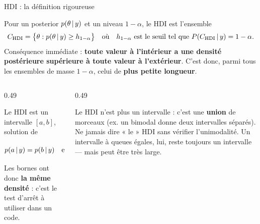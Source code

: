 
\begin{frame}{HDI : la définition rigoureuse}
\small
\vspace{-1mm}
\begin{kbox}
Pour un posterior $p(\theta \,\vert\, y)$ et un niveau $1-\alpha$, le HDI est
l'ensemble
\[
C_{\text{HDI}} = \big\{\theta : p(\theta \,\vert\, y) \geq h_{1-\alpha}\big\}
\quad\text{où}\quad h_{1-\alpha} \text{ est le seuil tel que } P(C_{\text{HDI}} \,\vert\, y) = 1-\alpha .
\]
Conséquence immédiate : \textbf{toute valeur à l'intérieur a une densité
postérieure supérieure à toute valeur à l'extérieur}. C'est donc, parmi tous les
ensembles de masse $1-\alpha$, celui de \textbf{plus petite longueur}.
\end{kbox}
\vspace{1mm}
\begin{columns}[t]
\begin{column}{0.49\textwidth}
\begin{ebox}
Le HDI est un intervalle $[a, b]$, solution de
\[
p(a \,\vert\, y) = p(b \,\vert\, y) \quad\text{et}\quad \int_a^b p(\theta \,\vert\, y)\mathrm{d}\theta = 1-\alpha .
\]
Les bornes ont donc \textbf{la même densité} : c'est le test d'arrêt à utiliser
dans un code.
\end{ebox}
\end{column}
\begin{column}{0.49\textwidth}
\begin{wbox}
Le HDI n'est plus un intervalle : c'est une \textbf{union} de morceaux
(ex. un bimodal donne deux intervalles séparés). Ne jamais dire « le » HDI
sans vérifier l'unimodalité. Un intervalle à queues égales, lui, reste toujours
un intervalle --- mais peut être très large.
\end{wbox}
\end{column}
\end{columns}
\end{frame}

